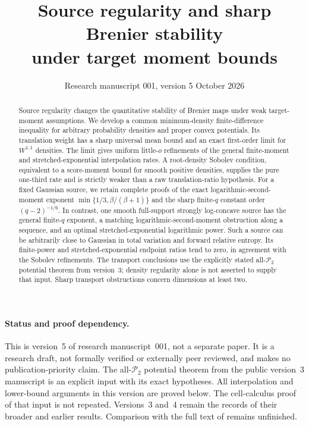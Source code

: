 \documentclass[11pt]{article}
\title{Source regularity and sharp Brenier stability\\under target moment bounds}
\author{}\date{Research manuscript 001, version 5\quad 7 October 2026}
\numberwithin{equation}{section}
\theoremstyle{remark}\newtheorem{remark}[theorem]{Remark}
\newcommand{\Prob}{\mathcal P}\newcommand{\dd}{\,\mathrm d}
\begin{document}
\maketitle\vspace{-1.5em}
\begin{abstract}
Source regularity changes the quantitative stability of Brenier maps under weak target-moment assumptions. We develop a common minimum-density finite-difference inequality for arbitrary probability densities and proper convex potentials. Its translation weight has a sharp universal mean bound and an exact first-order limit for $W^{1,1}$ densities. The limit gives uniform little-$o$ refinements of the general finite-moment and stretched-exponential interpolation rates. A root-density Sobolev condition, equivalent to a score-moment bound for smooth positive densities, supplies the pure one-third rate and is strictly weaker than a raw translation-ratio hypothesis. For a fixed Gaussian source, we retain complete proofs of the exact logarithmic-second-moment exponent $\min\{1/3,\beta/(\beta+1)\}$ and the sharp finite-$q$ constant order $(q-2)^{-1/6}$. In contrast, one smooth full-support strongly log-concave source has the general finite-$q$ exponent, a matching logarithmic-second-moment obstruction along a sequence, and an optimal stretched-exponential logarithmic power. Such a source can be arbitrarily close to Gaussian in total variation and forward relative entropy. Its finite-power and stretched-exponential endpoint ratios tend to zero, in agreement with the Sobolev refinements. The transport conclusions use the explicitly stated all-$\mathcal P_2$ potential theorem from version~3; density regularity alone is not asserted to supply that input. Sharp transport obstructions concern dimensions at least two.
\end{abstract}

\paragraph{Status and proof dependency.}
This is version~5 of research manuscript~001, not a separate paper. It is a research draft, not formally verified or externally peer reviewed, and makes no publication-priority claim. The all-$\Prob_2$ potential theorem from the public version~3 manuscript \cite{ManuscriptV3} is an explicit input with its exact hypotheses. All interpolation and lower-bound arguments in this version are proved below. The cell-calculus proof of that input is not repeated. Versions~3 and~4 \cite{ManuscriptV3,ManuscriptV4} remain the records of their broader and earlier results. Comparison with the full text of \cite{Merigot2026} remains unfinished.
\end{document}
